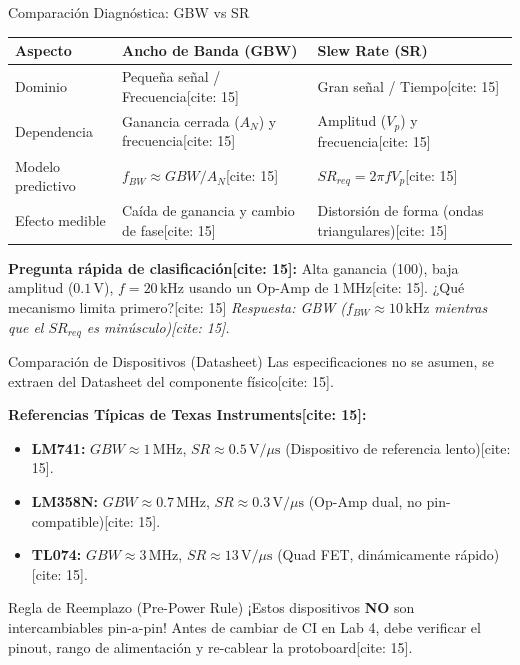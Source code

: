 \documentclass[aspectratio=169]{beamer}
\begin{document}
\begin{frame}{Comparación Diagnóstica: GBW vs SR}
    \begin{table}[]
        \centering
        \footnotesize
        \renewcommand{\arraystretch}{1.5}
        \begin{tabularx}{\textwidth}{>{\raggedright\arraybackslash\hsize=0.6\hsize}X >{\raggedright\arraybackslash\hsize=1.2\hsize}X >{\raggedright\arraybackslash\hsize=1.2\hsize}X}
        \toprule
        \rowcolor[HTML]{EFEFEF}
        \textbf{Aspecto} & \textbf{Ancho de Banda (GBW)} & \textbf{Slew Rate (SR)} \\ \midrule
        Dominio & Pequeña señal / Frecuencia[cite: 15] & Gran señal / Tiempo[cite: 15] \\
        Dependencia & Ganancia cerrada ($A_N$) y frecuencia[cite: 15] & Amplitud ($V_p$) y frecuencia[cite: 15] \\
        Modelo predictivo & $f_{BW} \approx GBW / A_N$[cite: 15] & $SR_{req} = 2\pi f V_p$[cite: 15] \\
        Efecto medible & Caída de ganancia y cambio de fase[cite: 15] & Distorsión de forma (ondas triangulares)[cite: 15] \\
        \bottomrule
        \end{tabularx}
    \end{table}

    \textbf{Pregunta rápida de clasificación[cite: 15]:} Alta ganancia (100), baja amplitud ($0.1\,\text{V}$), $f=20\,\text{kHz}$ usando un Op-Amp de $1\,\text{MHz}$[cite: 15]. ¿Qué mecanismo limita primero?[cite: 15]
    \textit{Respuesta: GBW ($f_{BW} \approx 10\,\text{kHz}$ mientras que el $SR_{req}$ es minúsculo)[cite: 15].}
\end{frame}

\begin{frame}{Comparación de Dispositivos (Datasheet)}
    Las especificaciones no se asumen, se extraen del Datasheet del componente físico[cite: 15].
    
    \vspace{0.2cm}
    \textbf{Referencias Típicas de Texas Instruments[cite: 15]:}
    \begin{itemize}
        \item \textbf{LM741:} $GBW \approx 1\,\text{MHz}$, $SR \approx 0.5\,\text{V}/\mu\text{s}$ (Dispositivo de referencia lento)[cite: 15].
        \item \textbf{LM358N:} $GBW \approx 0.7\,\text{MHz}$, $SR \approx 0.3\,\text{V}/\mu\text{s}$ (Op-Amp dual, no pin-compatible)[cite: 15].
        \item \textbf{TL074:} $GBW \approx 3\,\text{MHz}$, $SR \approx 13\,\text{V}/\mu\text{s}$ (Quad FET, dinámicamente rápido)[cite: 15].
    \end{itemize}

    \begin{alertblock}{Regla de Reemplazo (Pre-Power Rule)}
        ¡Estos dispositivos \textbf{NO} son intercambiables pin-a-pin! Antes de cambiar de CI en Lab 4, debe verificar el pinout, rango de alimentación y re-cablear la protoboard[cite: 15].
    \end{alertblock}
\end{frame}
\end{document}

